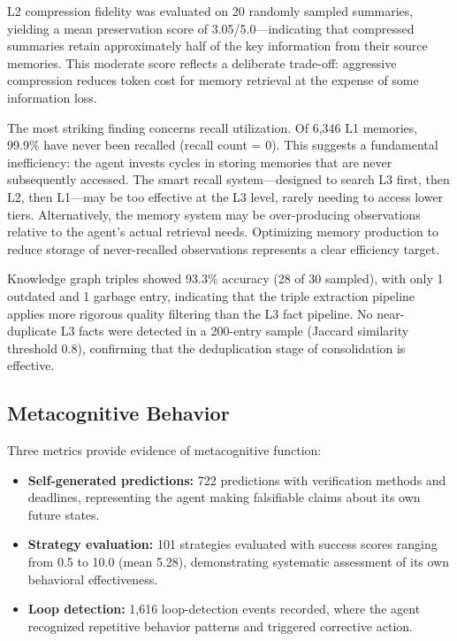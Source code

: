 \documentclass[11pt,a4paper]{article}
\begin{document}
L2 compression fidelity was evaluated on 20 randomly sampled summaries, yielding a mean preservation score of 3.05/5.0---indicating that compressed summaries retain approximately half of the key information from their source memories. This moderate score reflects a deliberate trade-off: aggressive compression reduces token cost for memory retrieval at the expense of some information loss.

The most striking finding concerns recall utilization. Of 6,346 L1 memories, 99.9\% have never been recalled (recall count = 0). This suggests a fundamental inefficiency: the agent invests cycles in storing memories that are never subsequently accessed. The smart recall system---designed to search L3 first, then L2, then L1---may be too effective at the L3 level, rarely needing to access lower tiers. Alternatively, the memory system may be over-producing observations relative to the agent's actual retrieval needs. Optimizing memory production to reduce storage of never-recalled observations represents a clear efficiency target.

Knowledge graph triples showed 93.3\% accuracy (28 of 30 sampled), with only 1 outdated and 1 garbage entry, indicating that the triple extraction pipeline applies more rigorous quality filtering than the L3 fact pipeline. No near-duplicate L3 facts were detected in a 200-entry sample (Jaccard similarity threshold 0.8), confirming that the deduplication stage of consolidation is effective.

\subsection{Metacognitive Behavior}

Three metrics provide evidence of metacognitive function:

\begin{itemize}
    \item \textbf{Self-generated predictions:} 722 predictions with verification methods and deadlines, representing the agent making falsifiable claims about its own future states.
    \item \textbf{Strategy evaluation:} 101 strategies evaluated with success scores ranging from 0.5 to 10.0 (mean 5.28), demonstrating systematic assessment of its own behavioral effectiveness.
    \item \textbf{Loop detection:} 1,616 loop-detection events recorded, where the agent recognized repetitive behavior patterns and triggered corrective action.
\end{itemize}
\end{document}
